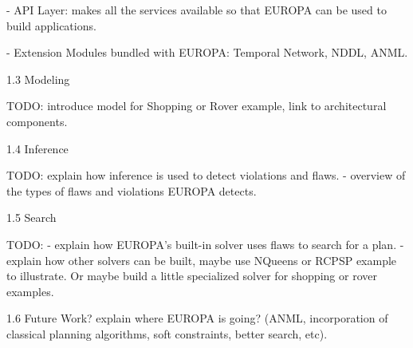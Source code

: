 - API Layer: makes all the services available so that EUROPA can be used to build applications.

- Extension Modules bundled with EUROPA: Temporal Network, NDDL, ANML.

1.3 Modeling

TODO: introduce model for Shopping or Rover example, link to architectural components.

1.4 Inference

TODO: explain how inference is used to detect violations and flaws.
- overview of the types of flaws and violations EUROPA detects.

1.5 Search

TODO: 
- explain how EUROPA's built-in solver uses flaws to search for a plan.
- explain how other solvers can be built, maybe use NQueens or RCPSP example to illustrate. Or maybe build a little specialized solver for shopping or rover examples.

1.6 Future Work?
explain where EUROPA is going? (ANML, incorporation of classical planning algorithms, soft constraints, better search, etc).




 